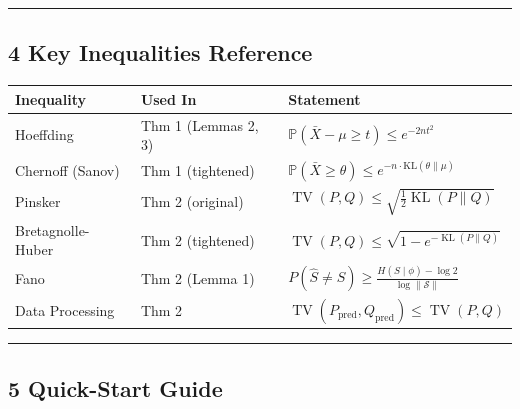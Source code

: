 \documentclass[
  12pt,
]{ctexart}
\begin{document}
\begin{center}\rule{0.5\linewidth}{0.5pt}\end{center}

\subsection{4 Key Inequalities
Reference}\label{key-inequalities-reference}

\begin{longtable}[]{@{}
  >{\raggedright\arraybackslash}p{}
  >{\raggedright\arraybackslash}p{}
  >{\raggedright\arraybackslash}p{}@{}}
\toprule\noalign{}
\begin{minipage}[b]{\linewidth}\raggedright
Inequality
\end{minipage} & \begin{minipage}[b]{\linewidth}\raggedright
Used In
\end{minipage} & \begin{minipage}[b]{\linewidth}\raggedright
Statement
\end{minipage} \\
\midrule\noalign{}
\endhead
\bottomrule\noalign{}
\endlastfoot
Hoeffding & Thm 1 (Lemmas 2, 3) &
\(\mathbb{P}(\bar{X} - \mu \geq t) \leq e^{-2nt^2}\) \\
Chernoff (Sanov) & Thm 1 (tightened) &
\(\mathbb{P}(\bar{X} \geq \theta) \leq e^{-n \cdot \text{KL}(\theta \|\mu)}\) \\
Pinsker & Thm 2 (original) &
\(\operatorname{TV}(P, Q) \leq \sqrt{\frac{1}{2}\operatorname{KL}(P\|Q)}\) \\
Bretagnolle-Huber & Thm 2 (tightened) &
\(\operatorname{TV}(P, Q) \leq \sqrt{1 - e^{-\operatorname{KL}(P\|Q)}}\) \\
Fano & Thm 2 (Lemma 1) &
\(P(\hat{S} \neq S) \geq \frac{H(S \mid \phi) - \log 2}{\log \|\mathcal{S}\|}\) \\
Data Processing & Thm 2 &
\(\operatorname{TV}(P_{\text{pred}}, Q_{\text{pred}}) \leq \operatorname{TV}(P, Q)\) \\
\end{longtable}

\begin{center}\rule{0.5\linewidth}{0.5pt}\end{center}

\subsection{5 Quick-Start Guide}\label{quick-start-guide}
\end{document}

